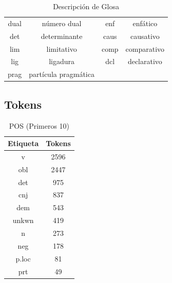 \documentclass[letterpaper,12pt,oneside]{scrbook}
\theoremstyle{definition}
\begin{document}
\begin{table}
\begin{tabular}{ c  c | c  c }
			dual & número dual & enf & enfático \\

			det & determinante & caus & causativo \\

			lim & limitativo & comp & comparativo \\

			lig & ligadura & dcl & declarativo \\

			prag & partícula pragmática & \\

		\end{tabular}

		\caption{Descripción de Glosa}

		\label{table:gloss_desc}

	\end{table}

	
	
	\subsection{Tokens}

	

	
	
	\begin{table}[ht]

		\centering

		\begin{tabular}{c | c}

			\textbf{Etiqueta} & \textbf{Tokens} \\ \hline

			v & 2596 \\

			obl & 2447 \\

			det & 975 \\

			cnj & 837 \\

			dem & 543 \\

			unkwn & 419 \\

			n & 273 \\

			neg & 178 \\

			p.loc & 81 \\

			prt & 49 \\

		\end{tabular}

		\caption{POS (Primeros 10)}

		\label{table_pos_tokens}

	\end{table}
\end{document}
